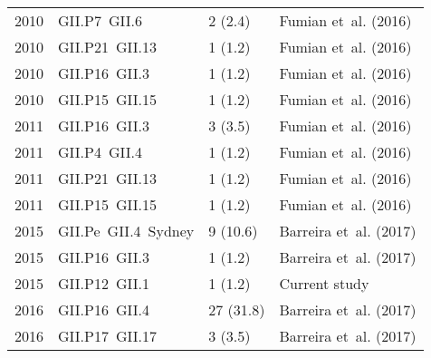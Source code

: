 \begin{table}[htbp]
\begin{tabular}{p{0.6cm}p{3.2cm}p{1.8cm}p{2.5cm}}
		2010          & GII.P7~GII.6                        & 2 (2.4)                    & Fumian et~al. (2016)   \\
		2010          & GII.P21~GII.13                      & 1 (1.2)                    & Fumian et~al. (2016)   \\
		2010          & GII.P16~GII.3                       & 1 (1.2)                    & Fumian et~al. (2016)   \\
		2010          & GII.P15~GII.15                      & 1 (1.2)                    & Fumian et~al. (2016)   \\
		2011          & GII.P16~GII.3                       & 3 (3.5)                    & Fumian et~al. (2016)   \\
		2011          & GII.P4~GII.4                        & 1 (1.2)                    & Fumian et~al. (2016)   \\
		2011          & GII.P21~GII.13                      & 1 (1.2)                    & Fumian et~al. (2016)   \\
		2011          & GII.P15~GII.15                      & 1 (1.2)                    & Fumian et~al. (2016)   \\
		2015          & GII.Pe~GII.4~Sydney                 & 9 (10.6)                   & Barreira et~al. (2017) \\
		2015          & GII.P16~GII.3                       & 1 (1.2)                    & Barreira et~al. (2017) \\
		2015          & GII.P12~GII.1                       & 1 (1.2)                    & Current study          \\
		2016          & GII.P16~GII.4                       & 27 (31.8)                  & Barreira et~al. (2017) \\
		2016          & GII.P17~GII.17                      & 3 (3.5)                    & Barreira et~al. (2017) \\
		\bottomrule
	\end{tabular}
	\label{tab:comprehensive_norovirus_strains}
\end{table}